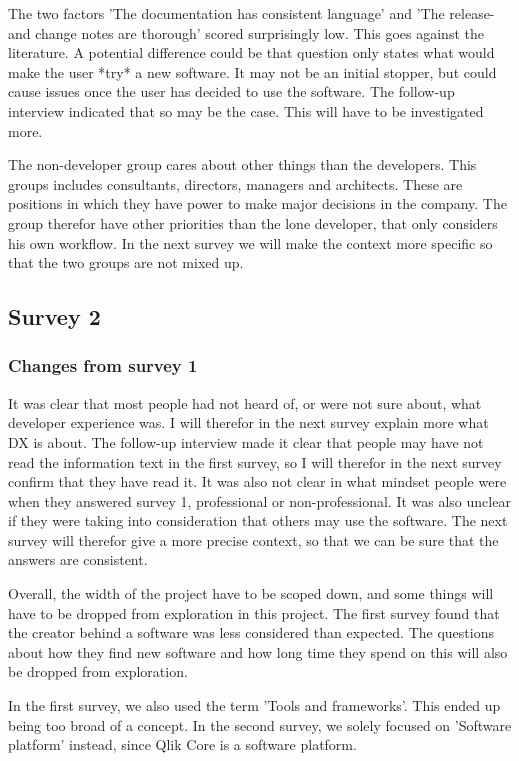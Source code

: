 \documentclass{article}
\begin{document}
The two factors 'The documentation has consistent language' and 'The
release- and change notes are thorough' scored surprisingly low. This
goes against the literature. A potential difference could be that
question only states what would make the user *try* a new software. It
may not be an initial stopper, but could cause issues once the user has
decided to use the software. The follow-up interview indicated that so
may be the case. This will have to be investigated more.

The non-developer group cares about other things than the developers.
This groups includes consultants, directors, managers and architects.
These are positions in which they have power to make major decisions in
the company. The group therefor have other priorities than the lone
developer, that only considers his own workflow. In the next survey we
will make the context more specific so that the two groups are not mixed
up.

\subsection{Survey 2}

\subsubsection{Changes from survey 1}

It was clear that most people had not heard of, or were not sure about,
what developer experience was. I will therefor in the next survey
explain more what DX is about. The follow-up interview made it clear
that people may have not read the information text in the first survey,
so I will therefor in the next survey confirm that they have read it. It
was also not clear in what mindset people were when they answered survey
1, professional or non-professional. It was also unclear if they were
taking into consideration that others may use the software. The next
survey will therefor give a more precise context, so that we can be sure
that the answers are consistent.

Overall, the width of the project have to be scoped down, and some
things will have to be dropped from exploration in this project. The
first survey found that the creator behind a software was less
considered than expected. The questions about how they find new software
and how long time they spend on this will also be dropped from
exploration.

In the first survey, we also used the term 'Tools and frameworks'. This
ended up being too broad of a concept. In the second survey, we solely
focused on 'Software platform' instead, since Qlik Core is a software platform.
\end{document}
